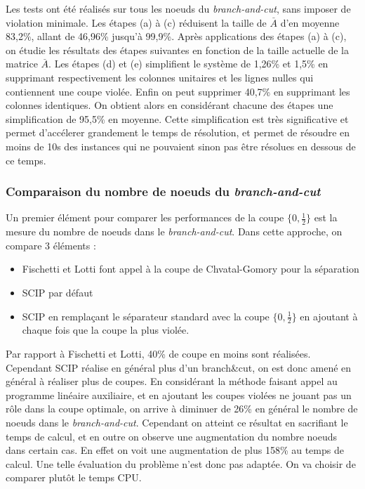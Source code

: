 \documentclass[12pt]{report}
\begin{document}
Les tests ont été réalisés sur tous les noeuds du \textit{branch-and-cut}, sans imposer de violation minimale.
Les étapes (a) à (c) réduisent la taille de $\overset{\_}{A}$ d'en moyenne 83,2\%, allant de 46,96\% jusqu'à 99,9\%.
Après applications des étapes (a) à (c), on étudie les résultats des étapes suivantes en fonction de la taille actuelle de la matrice $\overset{\_}{A}$. Les étapes (d) et (e) simplifient le système de 1,26\% et 1,5\% en supprimant respectivement les colonnes unitaires et les lignes nulles qui contiennent une coupe violée. Enfin on peut supprimer 40,7\% en supprimant les colonnes identiques.
On obtient alors en considérant chacune des étapes une simplification de 95,5\% en moyenne.
Cette simplification est très significative et permet d'accélerer grandement le temps de résolution, et permet de résoudre en moins de 10s des instances qui ne pouvaient sinon pas être résolues en dessous de ce temps.

\subsubsection{Comparaison du nombre de noeuds du \textit{branch-and-cut}}
Un premier élément pour comparer les performances de la coupe $\{0,\frac{1}{2}\}$ est la mesure du nombre de noeuds dans le \textit{branch-and-cut}. Dans cette approche, on compare 3 éléments :
\begin{itemize}
    \item Fischetti et Lotti font appel à la coupe de Chvatal-Gomory pour la séparation
    \item SCIP par défaut
    \item SCIP en remplaçant le séparateur standard avec la coupe $\{0,\frac{1}{2}\}$ en ajoutant à chaque fois que la coupe la plus violée.
\end{itemize}
Par rapport à Fischetti et Lotti, 40\% de coupe en moins sont réalisées. Cependant SCIP réalise en général plus d'un branch\&cut, on est donc amené en général à réaliser plus de coupes.
En considérant la méthode faisant appel au programme linéaire auxiliaire, et en ajoutant les coupes violées ne jouant pas un rôle dans la coupe optimale, on arrive à diminuer de 26\% en général le nombre de noeuds dans le \textit{branch-and-cut}. Cependant on atteint ce résultat en sacrifiant le temps de calcul, et en outre on observe une augmentation du nombre noeuds dans certain cas. En effet on voit une augmentation de plus 158\% au temps de calcul.
Une telle évaluation du problème n'est donc pas adaptée. On va choisir de comparer plutôt le temps CPU.
\end{document}
